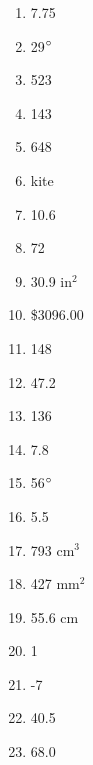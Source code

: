 \documentclass[../uilmath.tex]{subfiles}
\begin{document}
\begin{enumerate}[label=\bfseries\arabic*.]
    \item %
    7.75 

    \item %
    29$\degree$

    \item %
    523

    \item %
    143

    \item %
    648

    \item %
    kite 

    \item %
    10.6

    \item %
    72

    \item %
    30.9 in$^2$

    \item %
    \$3096.00

    \item %
    148

    \item %
    47.2

    \item %
    136

    \item %
    7.8

    \item %
    56$\degree$

    \item %
    5.5

    \item %
    793 cm$^3$

    \item %
    427 mm$^2$

    \item %
    55.6 cm
    
    \item %
    1

    \item %
    -7

    \item %
    40.5

    \item %
    68.0


\end{enumerate}
\end{document}
